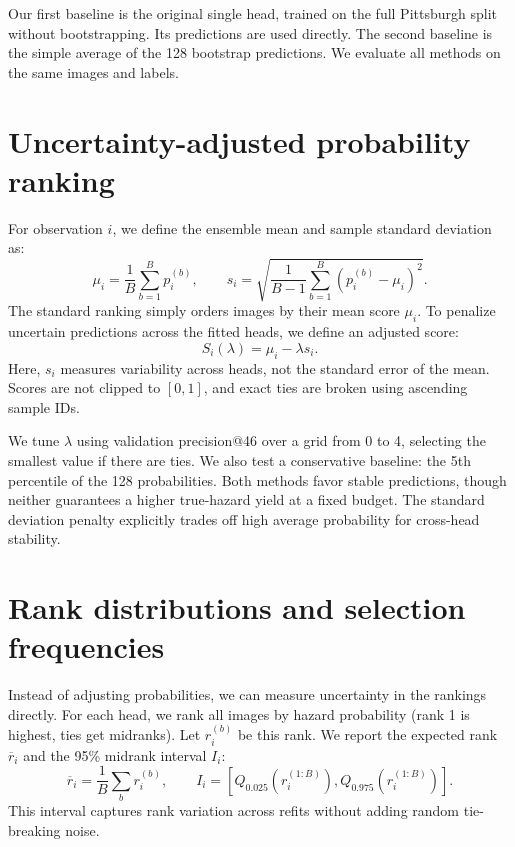 \documentclass[10pt,a4paper]{article}
\begin{document}
Our first baseline is the original single head, trained on the full Pittsburgh split without bootstrapping. Its predictions are used directly. The second baseline is the simple average of the 128 bootstrap predictions. We evaluate all methods on the same images and labels.

\section{Uncertainty-adjusted probability ranking}
\label{sec:adjusted}
For observation $i$, we define the ensemble mean and sample standard deviation as:
\begin{equation}
\mu_i=\frac{1}{B}\sum_{b=1}^{B}p_i^{(b)},\qquad
s_i=\sqrt{\frac{1}{B-1}\sum_{b=1}^{B}\left(p_i^{(b)}-\mu_i\right)^2}.
\end{equation}
The standard ranking simply orders images by their mean score $\mu_i$. To penalize uncertain predictions across the fitted heads, we define an adjusted score:
\begin{equation}
S_i(\lambda)=\mu_i-\lambda s_i.
\end{equation}
Here, $s_i$ measures variability across heads, not the standard error of the mean. Scores are not clipped to $[0,1]$, and exact ties are broken using ascending sample IDs.

We tune $\lambda$ using validation precision@46 over a grid from 0 to 4, selecting the smallest value if there are ties. We also test a conservative baseline: the 5th percentile of the 128 probabilities. Both methods favor stable predictions, though neither guarantees a higher true-hazard yield at a fixed budget. The standard deviation penalty explicitly trades off high average probability for cross-head stability.

\section{Rank distributions and selection frequencies}
\label{sec:ranks}
Instead of adjusting probabilities, we can measure uncertainty in the rankings directly. For each head, we rank all images by hazard probability (rank 1 is highest, ties get midranks). Let $r_i^{(b)}$ be this rank. We report the expected rank $\overline r_i$ and the 95\% midrank interval $I_i$:
\begin{equation}
\overline r_i=\frac{1}{B}\sum_b r_i^{(b)},\qquad
I_i=\left[Q_{0.025}(r_i^{(1:B)}),Q_{0.975}(r_i^{(1:B)})\right].
\end{equation}
This interval captures rank variation across refits without adding random tie-breaking noise.
\end{document}

